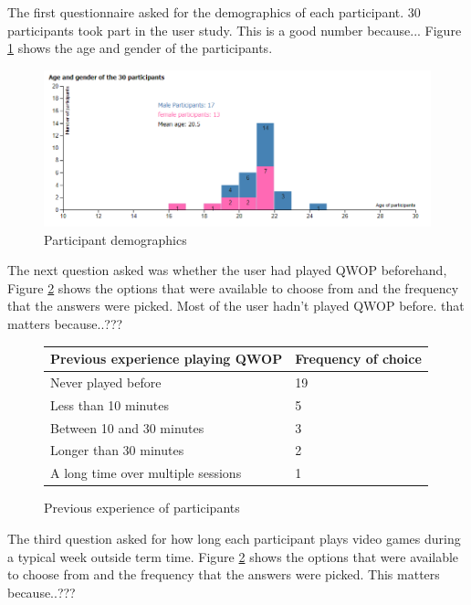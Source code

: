 \documentclass[12pt,a4paper,twoside,openright]{report}
\begin{document}
The first questionnaire asked for the demographics of each participant.
30 participants took part in the user study. This is a good number because...
Figure \ref{demographics} shows the age and gender of the participants.


\begin{figure}[tbh]
\centerline{\includegraphics[scale=0.7]{participantDemographics.PNG}}
\caption{Participant demographics}
\label{demographics}
\end{figure}

The next question asked was whether the user had played QWOP beforehand, Figure \ref{previousExperienceTable} shows the options that were available to choose from and the frequency that the answers were picked.
Most of the user hadn't played QWOP before.
that matters because..???


\begin{figure}[tbh]
\begin{center}
\begin{tabular}{ |l|l| }
  \hline
  Previous experience playing QWOP   & Frequency of choice \\ \hline \hline 
  Never played before                & 19 \\ \hline
  Less than 10 minutes               & 5  \\ \hline
  Between 10 and 30 minutes          & 3  \\ \hline
  Longer than 30 minutes             & 2  \\ \hline
  A long time over multiple sessions & 1  \\ \hline
\end{tabular}
\end{center}
\caption{Previous experience of participants}
\label{previousExperienceTable}
\end{figure}


The third question asked for how long each participant plays video games during a typical week outside term time. Figure \ref{previousExperienceTable} shows the options that were available to choose from and the frequency that the answers were picked.
This matters because..???
\end{document}
